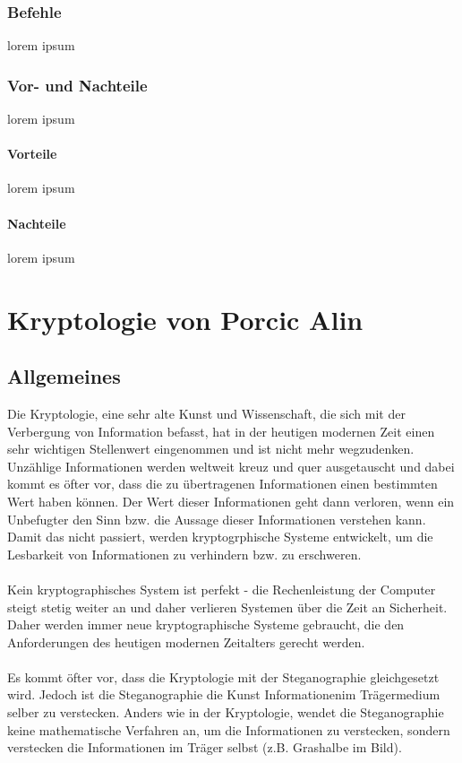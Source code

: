 \documentclass[12pt,a4paper]{report}
\begin{document}
\subsubsection{Befehle}
lorem ipsum
\subsubsection{Vor- und Nachteile}
lorem ipsum
\paragraph{Vorteile}
lorem ipsum
\paragraph{Nachteile}
lorem ipsum

\section{Kryptologie von Porcic Alin}
\subsection{Allgemeines}

Die Kryptologie, eine sehr alte Kunst und Wissenschaft, die sich mit der Verbergung von Information befasst, hat in der heutigen modernen Zeit einen sehr wichtigen Stellenwert eingenommen und ist nicht mehr wegzudenken. Unzählige Informationen werden weltweit kreuz und quer ausgetauscht und dabei kommt es öfter vor, dass die zu übertragenen Informationen einen bestimmten Wert haben können. Der Wert dieser Informationen geht dann verloren, wenn ein Unbefugter den Sinn bzw. die Aussage dieser Informationen verstehen kann. Damit das nicht passiert, werden kryptogrphische Systeme entwickelt, um die Lesbarkeit von Informationen zu verhindern bzw. zu erschweren.\\\\

Kein kryptographisches System ist perfekt - die Rechenleistung der Computer steigt stetig weiter an und daher verlieren Systemen über die Zeit an Sicherheit. Daher werden immer neue kryptographische Systeme gebraucht, die den Anforderungen des heutigen modernen Zeitalters gerecht werden.\\\\

Es kommt öfter vor, dass die Kryptologie mit der Steganographie gleichgesetzt wird. Jedoch ist die Steganographie die Kunst Informationenim Trägermedium selber zu verstecken. Anders wie in der Kryptologie, wendet die Steganographie keine mathematische Verfahren an, um die Informationen zu verstecken, sondern verstecken die Informationen im Träger selbst (z.B. Grashalbe im Bild).\\\\
\end{document}

